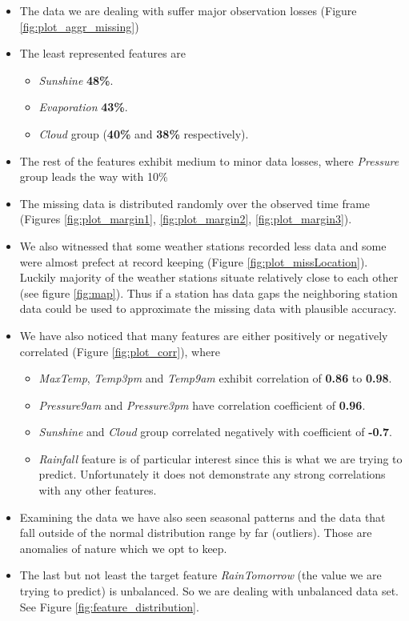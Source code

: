 \begin{itemize}
\tightlist
\item
  The data we are dealing with suffer major observation losses (Figure
  \ref{fig:plot_aggr_missing})
\item
  The least represented features are

  \begin{itemize}
  \tightlist
  \item
    \emph{Sunshine} \textbf{48\%}.
  \item
    \emph{Evaporation} \textbf{43\%}.
  \item
    \emph{Cloud} group (\textbf{40\%} and \textbf{38\%} respectively).
  \end{itemize}
\item
  The rest of the features exhibit medium to minor data losses, where
  \emph{Pressure} group leads the way with 10\%
\item
  The missing data is distributed randomly over the observed time frame
  (Figures \ref{fig:plot_margin1}, \ref{fig:plot_margin2},
  \ref{fig:plot_margin3}).
\item
  We also witnessed that some weather stations recorded less data and
  some were almost prefect at record keeping (Figure
  \ref{fig:plot_missLocation}). Luckily majority of the weather stations
  situate relatively close to each other (see figure \ref{fig:map}).
  Thus if a station has data gaps the neighboring station data could be
  used to approximate the missing data with plausible accuracy.
\item
  We have also noticed that many features are either positively or
  negatively correlated (Figure \ref{fig:plot_corr}), where

  \begin{itemize}
  \tightlist
  \item
    \emph{MaxTemp}, \emph{Temp3pm} and \emph{Temp9am} exhibit
    correlation of \textbf{0.86} to \textbf{0.98}.
  \item
    \emph{Pressure9am} and \emph{Pressure3pm} have correlation
    coefficient of \textbf{0.96}.
  \item
    \emph{Sunshine} and \emph{Cloud} group correlated negatively with
    coefficient of \textbf{-0.7}.
  \item
    \emph{Rainfall} feature is of particular interest since this is what
    we are trying to predict. Unfortunately it does not demonstrate any
    strong correlations with any other features.
  \end{itemize}
\item
  Examining the data we have also seen seasonal patterns and the data
  that fall outside of the normal distribution range by far (outliers).
  Those are anomalies of nature which we opt to keep.
\item
  The last but not least the target feature \emph{RainTomorrow} (the
  value we are trying to predict) is unbalanced. So we are dealing with
  unbalanced data set. See Figure \ref{fig:feature_distribution}.
\end{itemize}

